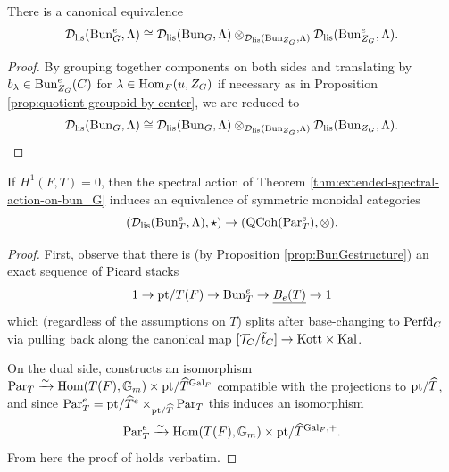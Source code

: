 \begin{corol}\label{corol:relative-tensor-over-center}
    There is a canonical equivalence 
    \begin{equation*}
     \mathcal{D}_{\textnormal{lis}}(\mathrm{Bun}_{G}^{e},\Lambda) \cong 
     \mathcal{D}_{\textnormal{lis}}(\mathrm{Bun}_{G},\Lambda) \otimes_{
     \mathcal{D}_{\textnormal{lis}}(\mathrm{Bun}_{Z_{G}},\Lambda)} 
     \mathcal{D}_{\textnormal{lis}}(\mathrm{Bun}_{Z_{G}}^{e},\Lambda).
    \end{equation*}
\end{corol}

\begin{proof}
    By grouping together components on both sides and translating by $b_{\lambda} \in \mathrm{Bun}_{Z_{G}}^{e}(C)$ for $\lambda \in \mathrm{Hom}_F(u, Z_G)$ if necessary as in Proposition \ref{prop:quotient-groupoid-by-center}, we are reduced to 
    $$\mathcal{D}_{\textnormal{lis}}(\mathrm{Bun}_{G},\Lambda) \cong 
     \mathcal{D}_{\textnormal{lis}}(\mathrm{Bun}_{G},\Lambda) \otimes_{
     \mathcal{D}_{\textnormal{lis}}(\mathrm{Bun}_{Z_{G}},\Lambda)} 
     \mathcal{D}_{\textnormal{lis}}(\mathrm{Bun}_{Z_{G}},\Lambda).$$
\end{proof}

\begin{prop}\label{prop:equivalence-monoidal-categories}
    If $H^{1}(F,T)=0$, then the spectral action of Theorem \ref{thm:extended-spectral-action-on-bun_G} induces an equivalence of symmetric monoidal categories
    \begin{equation*}
        (\mathcal{D}_{\textnormal{lis}}(\mathrm{Bun}_{T}^{e},\Lambda),\star) \to (\mathrm{QCoh}(\mathrm{Par}_{T}^{e}), \otimes).
    \end{equation*}
\end{prop}


\begin{proof}
    First, observe that there is (by Proposition \ref{prop:BunGestructure}) an exact sequence of Picard stacks
    \begin{equation*}
        1 \to \mathrm{pt}/T(F) \to \mathrm{Bun}_{T}^{e} \to \underline{B_{e}(T)} \to 1
    \end{equation*}
    which (regardless of the assumptions on $T$) splits after base-changing to $\mathrm{Perfd}_{C}$ via pulling back along the canonical map $[\mathcal{T}_{C}/\tilde{t}_{C}] \to \mathrm{Kott} \times \mathrm{Kal}$. 

    On the dual side, \cite[Lemma 2.5]{Zou26} constructs an isomorphism $\mathrm{Par}_{T} \xrightarrow{\sim} \mathrm{Hom}(T(F), \mathbb{G}_{m}) \times \mathrm{pt}/\widehat{T}^{\mathrm{Gal}_{F}}$ compatible with the projections to $\mathrm{pt}/\widehat{T}$, and since $\mathrm{Par}_{T}^{e} = \mathrm{pt}/\widehat{T}^{e} \times_{\mathrm{pt}/\widehat{T}} \mathrm{Par}_{T}$ this induces an isomorphism 
    \begin{equation*}
         \mathrm{Par}_{T}^{e} \xrightarrow{\sim} \mathrm{Hom}(T(F), \mathbb{G}_{m}) \times \mathrm{pt}/\widehat{T}^{\mathrm{Gal}_{F},+}.
    \end{equation*}
    From here the proof of \cite[Theorem 3.4]{Zou26} holds verbatim.
\end{proof}


